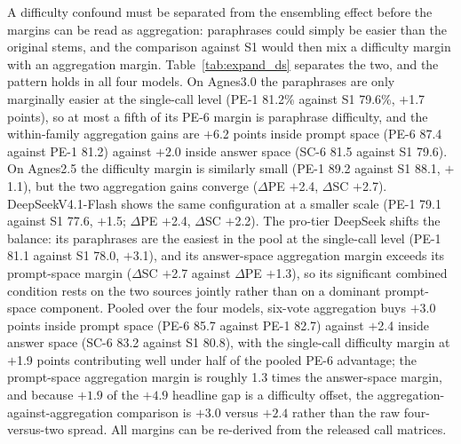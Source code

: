 A difficulty confound must be separated from the ensembling effect before the margins can be read as aggregation: paraphrases could simply be easier than the original stems, and the comparison against S1 would then mix a difficulty margin with an aggregation margin. Table~\ref{tab:expand_ds} separates the two, and the pattern holds in all four models. On Agnes3.0 the paraphrases are only marginally easier at the single-call level (PE-1 81.2\% against S1 79.6\%, $+$1.7 points), so at most a fifth of its PE-6 margin is paraphrase difficulty, and the within-family aggregation gains are $+$6.2 points inside prompt space (PE-6 87.4 against PE-1 81.2) against $+$2.0 inside answer space (SC-6 81.5 against S1 79.6). On Agnes2.5 the difficulty margin is similarly small (PE-1 89.2 against S1 88.1, $+$1.1), but the two aggregation gains converge ($\Delta$PE $+$2.4, $\Delta$SC $+$2.7). DeepSeekV4.1-Flash shows the same configuration at a smaller scale (PE-1 79.1 against S1 77.6, $+$1.5; $\Delta$PE $+$2.4, $\Delta$SC $+$2.2). The pro-tier DeepSeek shifts the balance: its paraphrases are the easiest in the pool at the single-call level (PE-1 81.1 against S1 78.0, $+$3.1), and its answer-space aggregation margin exceeds its prompt-space margin ($\Delta$SC $+$2.7 against $\Delta$PE $+$1.3), so its significant combined condition rests on the two sources jointly rather than on a dominant prompt-space component. Pooled over the four models, six-vote aggregation buys $+$3.0 points inside prompt space (PE-6 85.7 against PE-1 82.7) against $+$2.4 inside answer space (SC-6 83.2 against S1 80.8), with the single-call difficulty margin at $+$1.9 points contributing well under half of the pooled PE-6 advantage; the prompt-space aggregation margin is roughly 1.3 times the answer-space margin, and because $+1.9$ of the $+4.9$ headline gap is a difficulty offset, the aggregation-against-aggregation comparison is $+3.0$ versus $+2.4$ rather than the raw four-versus-two spread. All margins can be re-derived from the released call matrices.

\begin{table}[tbp]
\centering
\footnotesize
\caption{Expansion-set decomposition for the fully covered models: single-call accuracy of original-stem samples (S1) and paraphrase first-samples (PE-1) against the six-vote ensembles (SC-6, PE-6), with the within-family ensembling gains ($\Delta$SC $=$ SC-6 $-$ S1, $\Delta$PE $=$ PE-6 $-$ PE-1), by dataset. Pooled rows weight questions equally.}
\label{tab:expand_ds}

\end{table}

